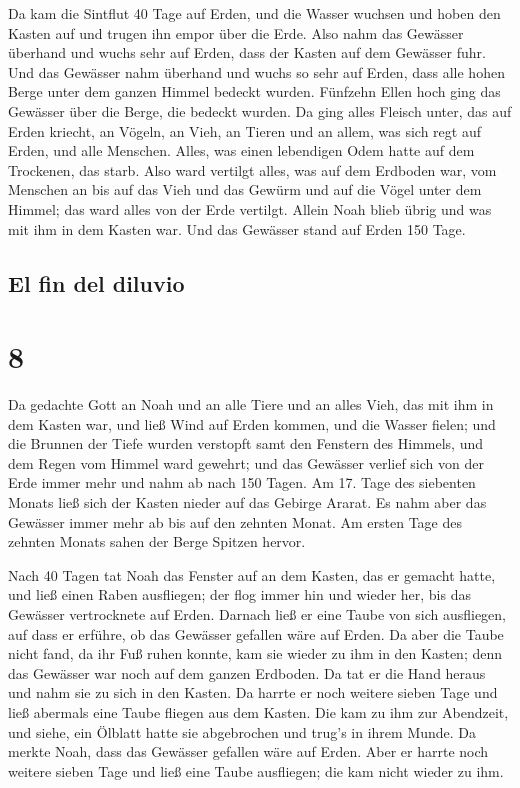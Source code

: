  Da kam die Sintflut 40 Tage auf Erden, und die Wasser
wuchsen und hoben den Kasten auf und trugen ihn empor über die Erde.
 Also nahm das Gewässer überhand und wuchs sehr auf
Erden, dass der Kasten auf dem Gewässer fuhr.  Und das
Gewässer nahm überhand und wuchs so sehr auf Erden, dass alle hohen
Berge unter dem ganzen Himmel bedeckt wurden.  Fünfzehn
Ellen hoch ging das Gewässer über die Berge, die bedeckt wurden.
 Da ging alles Fleisch unter, das auf Erden kriecht, an
Vögeln, an Vieh, an Tieren und an allem, was sich regt auf Erden, und
alle Menschen.  Alles, was einen lebendigen Odem hatte
auf dem Trockenen, das starb.  Also ward vertilgt alles,
was auf dem Erdboden war, vom Menschen an bis auf das Vieh und das
Gewürm und auf die Vögel unter dem Himmel; das ward alles von der Erde
vertilgt. Allein Noah blieb übrig und was mit ihm in dem Kasten war.
 Und das Gewässer stand auf Erden 150 Tage.

\hypertarget{el-fin-del-diluvio}{%
\subsection{El fin del diluvio}\label{el-fin-del-diluvio}}

\hypertarget{section-7}{%
\section{8}\label{section-7}}

 Da gedachte Gott an Noah und an alle Tiere und an alles
Vieh, das mit ihm in dem Kasten war, und ließ Wind auf Erden kommen, und
die Wasser fielen;  und die Brunnen der Tiefe wurden
verstopft samt den Fenstern des Himmels, und dem Regen vom Himmel ward
gewehrt;  und das Gewässer verlief sich von der Erde immer
mehr und nahm ab nach 150 Tagen.  Am 17. Tage des
siebenten Monats ließ sich der Kasten nieder auf das Gebirge Ararat.
 Es nahm aber das Gewässer immer mehr ab bis auf den
zehnten Monat. Am ersten Tage des zehnten Monats sahen der Berge Spitzen
hervor.

 Nach 40 Tagen tat Noah das Fenster auf an dem Kasten, das
er gemacht hatte,  und ließ einen Raben ausfliegen; der
flog immer hin und wieder her, bis das Gewässer vertrocknete auf Erden.
 Darnach ließ er eine Taube von sich ausfliegen, auf dass
er erführe, ob das Gewässer gefallen wäre auf Erden.  Da
aber die Taube nicht fand, da ihr Fuß ruhen konnte, kam sie wieder zu
ihm in den Kasten; denn das Gewässer war noch auf dem ganzen Erdboden.
Da tat er die Hand heraus und nahm sie zu sich in den Kasten.
 Da harrte er noch weitere sieben Tage und ließ abermals
eine Taube fliegen aus dem Kasten.  Die kam zu ihm zur
Abendzeit, und siehe, ein Ölblatt hatte sie abgebrochen und trug's in
ihrem Munde. Da merkte Noah, dass das Gewässer gefallen wäre auf Erden.
 Aber er harrte noch weitere sieben Tage und ließ eine
Taube ausfliegen; die kam nicht wieder zu ihm.

